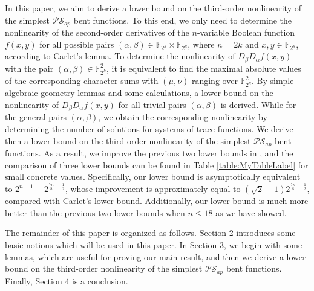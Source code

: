 \documentclass{article}
\newcommand{\F}{\mathbb{F}}
\newcommand{\0}{\textbf{0}}
\newcommand{\1}{\textbf{1}}
\theoremstyle{plain}
\begin{document}
    In this paper, we aim to derive a lower bound on the third-order nonlinearity of the simplest $\mathcal{PS}_{ap}$ bent functions.
    To this end, we only need to determine the nonlinearity of the second-order derivatives of the $n$-variable Boolean function $f(x,y)$ for all possible pairs $(\alpha,\beta)\in\F_{2^k}\times\F_{2^k}$, where $n=2k$ and $x,y\in\F_{2^k}$, according to Carlet's lemma.
    To determine the nonlinearity of $D_{\beta}D_{\alpha}f(x,y)$ with the pair $(\alpha,\beta)\in\F_{2^k}^2$, it is equivalent to find the maximal absolute values of the corresponding character sums with $(\mu,\nu)$ ranging over $\F_{2^k}^2$.
    By simple algebraic geometry lemmas and some calculations, a lower bound on the nonlinearity of $D_{\beta}D_{\alpha}f(x,y)$ for all trivial pairs $(\alpha,\beta)$ is derived.
    While for the general pairs $(\alpha,\beta)$, we obtain the corresponding nonlinearity by determining the number of solutions for systems of trace functions.
    We derive then a lower bound on the third-order nonlinearity of the simplest $\mathcal{PS}_{ap}$ bent functions.
    As a result, 
    we improve the previous two lower bounds in \cite{TangCT2013NL_2bent,Carlet2011NL_Profile_Dillon}, and the comparison of three lower bounds can be found in Table \ref{table:MyTableLabel} for small concrete values.
    Specifically, our lower bound is asymptotically equivalent to $2^{n-1}-2^{\frac{7n}{8}-\frac{1}{2}}$, whose
    improvement is approximately equal to $(\sqrt{2}-1)2^{\frac{7n}{8}-\frac{1}{2}}$, compared with Carlet's lower bound.
    Additionally, our lower bound is much more better than the previous two lower bounds when $n\le 18$ as we have showed.

    The remainder of this paper is organized as follows.
    Section 2 introduces some basic notions which will be used in this paper.
    In Section 3, we begin with some lemmas, which are useful for proving our main result, and then we derive a lower bound on the third-order nonlinearity of the simplest $\mathcal{PS}_{ap}$ bent functions.
    Finally, Section 4 is a conclusion.
\end{document}
